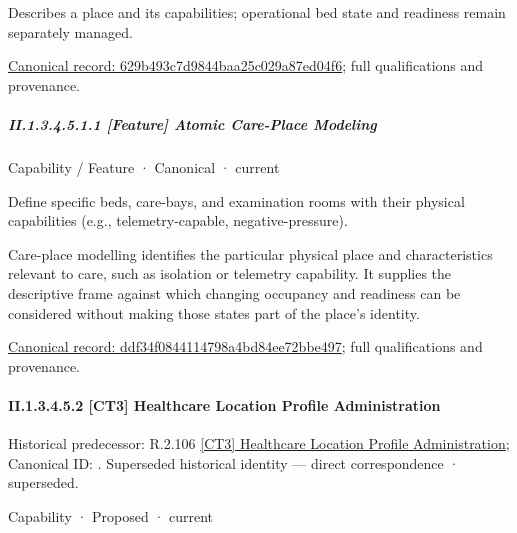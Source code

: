 Describes a place and its capabilities; operational bed state and readiness remain separately managed.


{\footnotesize \href{../../../../continuum/strategy/capability/629b493c7d9844baa25c029a87ed04f6.md}{Canonical record: 629b493c7d9844baa25c029a87ed04f6}; full qualifications and provenance.}\par
\subparagraph*{II.1.3.4.5.1.1 [Feature] Atomic Care-Place Modeling}
\label{navigation:II.1.3.4.5.1.1}

\label{element:ddf34f0844114798a4bd84ee72bbe497}
{\small Capability / Feature · Canonical · current}\par

Define specific beds, care-bays, and examination rooms with their physical capabilities (e.g., telemetry-capable, negative-pressure).



Care-place modelling identifies the particular physical place and characteristics relevant to care, such as isolation or telemetry capability. It supplies the descriptive frame against which changing occupancy and readiness can be considered without making those states part of the place's identity.


{\footnotesize \href{../../../../continuum/strategy/capability/feature/ddf34f0844114798a4bd84ee72bbe497.md}{Canonical record: ddf34f0844114798a4bd84ee72bbe497}; full qualifications and provenance.}\par
\paragraph*{II.1.3.4.5.2 [CT3] Healthcare Location Profile Administration}
\label{navigation:II.1.3.4.5.2}

{\small Historical predecessor: R.2.106 \hyperref[element:8a04d1f16d0849e786d2aaec33e0ba87]{[CT3] Healthcare Location Profile Administration}; Canonical ID: \texttt{}. Superseded historical identity — direct correspondence · superseded.}\par
\label{element:e579e54a08bb4f899a504aa998ba246b}
{\small Capability · Proposed · current}\par

